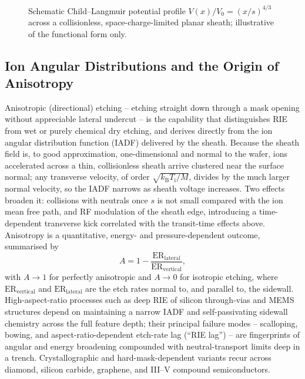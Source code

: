 \begin{figure}[htbp]
\centering
{}
\caption{Schematic Child--Langmuir potential profile $V(x)/V_{0} = (x/s)^{4/3}$ across a collisionless, space-charge-limited planar sheath; illustrative of the functional form only.}
\label{fig:etch_cl}
\end{figure}

\subsection{Ion Angular Distributions and the Origin of Anisotropy}

Anisotropic (directional) etching -- etching straight down through a mask opening without appreciable lateral undercut -- is the capability that distinguishes RIE from wet or purely chemical dry etching, and derives directly from the ion angular distribution function (IADF) delivered by the sheath. Because the sheath field is, to good approximation, one-dimensional and normal to the wafer, ions accelerated across a thin, collisionless sheath arrive clustered near the surface normal; any transverse velocity, of order $\sqrt{k_{\mathrm{B}}T_{\mathrm{i}}/M}$, divides by the much larger normal velocity, so the IADF narrows as sheath voltage increases. Two effects broaden it: collisions with neutrals once $s$ is not small compared with the ion mean free path, and RF modulation of the sheath edge, introducing a time-dependent transverse kick correlated with the transit-time effects above. Anisotropy is a quantitative, energy- and pressure-dependent outcome, summarised by
\begin{equation}
A = 1 - \frac{\mathrm{ER}_{\mathrm{lateral}}}{\mathrm{ER}_{\mathrm{vertical}}},
\label{eq:etch_aniso}
\end{equation}
with $A \to 1$ for perfectly anisotropic and $A \to 0$ for isotropic etching, where $\mathrm{ER}_{\mathrm{vertical}}$ and $\mathrm{ER}_{\mathrm{lateral}}$ are the etch rates normal to, and parallel to, the sidewall. High-aspect-ratio processes such as deep RIE of silicon through-vias and MEMS structures depend on maintaining a narrow IADF and self-passivating sidewall chemistry across the full feature depth; their principal failure modes -- scalloping, bowing, and aspect-ratio-dependent etch-rate lag (``RIE lag'') -- are fingerprints of angular and energy broadening compounded with neutral-transport limits deep in a trench. Crystallographic and hard-mask-dependent variants recur across diamond, silicon carbide, graphene, and III--V compound semiconductors.

